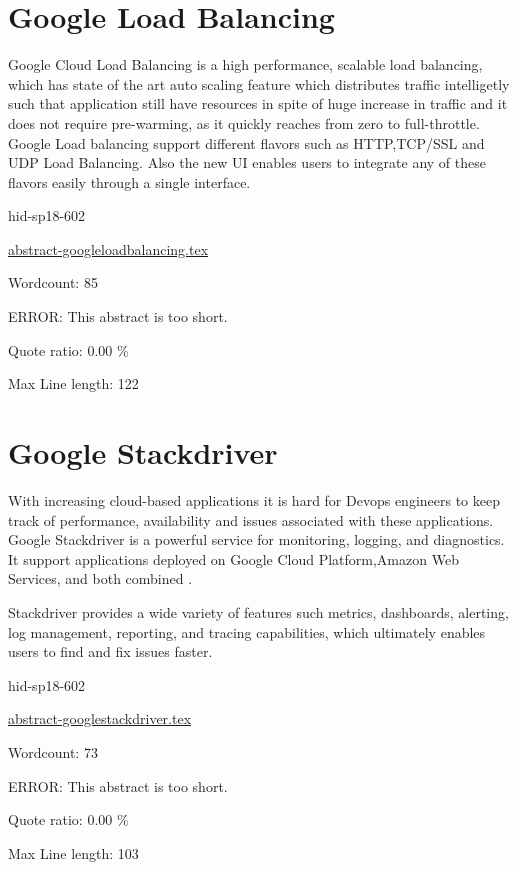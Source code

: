 \section{Google Load Balancing}

Google Cloud Load Balancing is a high performance, scalable load balancing, 
which has state of the art auto scaling feature which distributes traffic 
intelligetly such that application still have resources in spite of huge increase 
in traffic and it does not require pre-warming, as it quickly reaches 
from zero to full-throttle. 
Google Load balancing support different flavors such as HTTP,TCP/SSL and UDP 
Load Balancing\cite{hid-sp18-602-www-loadbalancing-main}. Also the new UI enables users to integrate any of these flavors 
easily through a single interface.



\begin{IU}

hid-sp18-602

\href{https://github.com/cloudmesh-community/hid-sp18-602/blob/master//technology/abstract-googleloadbalancing.tex}{abstract-googleloadbalancing.tex}

 

Wordcount: 85

ERROR: This abstract is too short.


Quote ratio: 0.00 \%
 
Max Line length: 122
\end{IU}

\section{Google Stackdriver}

With increasing cloud-based applications it is hard for Devops engineers to keep
track of performance, availability and issues associated with these applications.
Google Stackdriver is a powerful service for monitoring, logging, and diagnostics. 
It support applications deployed on Google Cloud Platform,Amazon Web Services, and both combined
\cite{hid-sp18-602-www-google-stackdriver-main}.

Stackdriver provides a wide variety of features such metrics, dashboards, 
alerting, log management, reporting, and tracing capabilities, which 
ultimately enables users to find and fix issues faster\cite{hid-sp18-602-www-google-stackdriver-main}. 


\begin{IU}

hid-sp18-602

\href{https://github.com/cloudmesh-community/hid-sp18-602/blob/master//technology/abstract-googlestackdriver.tex}{abstract-googlestackdriver.tex}

 

Wordcount: 73

ERROR: This abstract is too short.


Quote ratio: 0.00 \%
 
Max Line length: 103
\end{IU}

